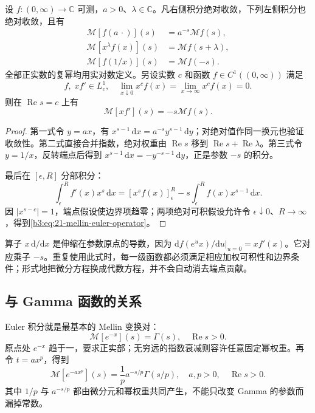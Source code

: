 \begin{proposition}[缩放、幂乘与倒数换元]\label{b3:prop:21-mellin-rules}
设 \(f:(0,\infty)\to\mathbb C\) 可测，\(a>0\)、\(\lambda\in\mathbb C\)。凡右侧积分绝对收敛，下列左侧积分也绝对收敛，且有
\[
 \begin{aligned}
 \mathcal M[f(a\,\cdot)](s)&=a^{-s}\mathcal Mf(s),\\
 \mathcal M[x^\lambda f(x)](s)&=\mathcal Mf(s+\lambda),\\
 \mathcal M[f(1/x)](s)&=\mathcal Mf(-s).
 \end{aligned}
\]
全部正实数的复幂均用实对数定义。另设实数 \(c\) 和函数 \(f\in C^1((0,\infty))\) 满足
\[
 f,\;xf'\in L^1_c,
 \quad \lim_{x\downarrow0}x^cf(x)=\lim_{x\to\infty}x^cf(x)=0.
\]
则在 \(\operatorname{Re}s=c\) 上有
\begin{equation}\label{b3:eq:21-mellin-euler-operator}
 \mathcal M[xf'](s)=-s\mathcal Mf(s).
\end{equation}
\end{proposition}
\begin{proof}
第一式令 \(y=ax\)，有 \(x^{s-1}\,\mathrm dx=a^{-s}y^{s-1}\,\mathrm dy\)；对绝对值作同一换元也验证收敛性。第二式直接合并指数，绝对权重由 \(\operatorname{Re}s\) 移到 \(\operatorname{Re}s+\operatorname{Re}\lambda\)。第三式令 \(y=1/x\)，反转端点后得到 \(x^{s-1}\,\mathrm dx=-y^{-s-1}\,\mathrm dy\)，正是参数 \(-s\) 的积分。

最后在 \([\epsilon,R]\) 分部积分：
\[
 \int_\epsilon^R f'(x)x^s\,\mathrm dx
 =[x^sf(x)]_\epsilon^R-s\int_\epsilon^R f(x)x^{s-1}\,\mathrm dx.
\]
因 \(|x^{s-c}|=1\)，端点假设使边界项趋零；两项绝对可积假设允许令 \(\epsilon\downarrow0\)、\(R\to\infty\)，得到\eqref{b3:eq:21-mellin-euler-operator}。
\end{proof}

算子 \(x\,\mathrm d/\mathrm dx\) 是伸缩在参数原点的导数，因为 \(\left.\mathrm d f(e^u x)/\mathrm du\right|_{u=0}=xf'(x)\)。它对应乘子 \(-s\)。重复使用此式时，每一级函数都必须满足相应加权可积性和边界条件；形式地把微分方程换成代数方程，并不会自动消去端点贡献。

\subsection{与 Gamma 函数的关系}
\label{b3:subsec:210503}

Euler 积分就是最基本的 Mellin 变换对：
\[
 \mathcal M[e^{-x}](s)=\Gamma(s),\quad \operatorname{Re}s>0.
\]
原点处 \(e^{-x}\) 趋于一，要求正实部；无穷远的指数衰减则容许任意固定幂权重。再令 \(t=ax^p\)，得到
\begin{equation}\label{b3:eq:21-mellin-exponential}
 \mathcal M[e^{-ax^p}](s)=\frac1p a^{-s/p}\Gamma(s/p),
 \quad a,p>0,\quad \operatorname{Re}s>0.
\end{equation}
其中 \(1/p\) 与 \(a^{-s/p}\) 都由微分元和幂权重共同产生，不能只改变 Gamma 的参数而漏掉常数。

